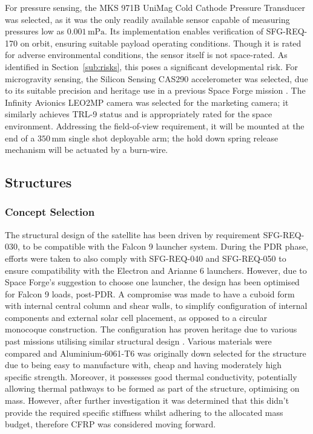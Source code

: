 \documentclass[a4paper, 11pt, conference]{IEEEtran}
\begin{document}
For pressure sensing, the MKS 971B UniMag Cold Cathode Pressure Transducer was selected, as it was the only readily available sensor capable of measuring pressures low as $0.001\,\mathrm{mPa}$. Its implementation enables verification of SFG-REQ-170 on orbit, ensuring suitable payload operating conditions. Though it is rated for adverse environmental conditions, the sensor itself is not space-rated. As identified in Section~\ref{sub:risks}, this poses a significant developmental risk. For microgravity sensing, the Silicon Sensing CAS290 accelerometer was selected, due to its suitable precision and heritage use in a previous Space Forge mission \cite{noauthor_empowering_2024}. The Infinity Avionics LEO2MP camera was selected for the marketing camera; it similarly achieves TRL-9 status and is appropriately rated for the space environment. Addressing the field-of-view requirement, it will be mounted at the end of a $350\,\mathrm{mm}$ single shot deployable arm; the hold down spring release mechanism will be actuated by a burn-wire.

\label{sub:secondary_payloads}

\subsection{Structures}
\subsubsection{Concept Selection}
The structural design of the satellite has been driven by requirement SFG-REQ-030, to be compatible with the Falcon 9 launcher system. During the PDR phase, efforts were taken to also comply with SFG-REQ-040 and SFG-REQ-050 to ensure compatibility with the Electron and Arianne 6 launchers. However, due to Space Forge’s suggestion to choose one launcher, the design has been optimised for Falcon 9 loads, post-PDR. A compromise was made to have a cuboid form with internal central column and shear walls, to simplify configuration of internal components and external solar cell placement, as opposed to a circular monocoque construction. The configuration has proven heritage due to various past missions utilising similar structural design \cite{StarfishSpace2024}. Various materials were compared and Aluminium-6061-T6 was originally down selected for the structure due to being easy to manufacture with, cheap and having moderately high specific strength. Moreover, it possesses good thermal conductivity, potentially allowing thermal pathways to be formed as part of the structure, optimising on mass. However, after further investigation it was determined that this didn’t provide the required specific stiffness whilst adhering to the allocated mass budget, therefore CFRP was considered moving forward.
\end{document}
